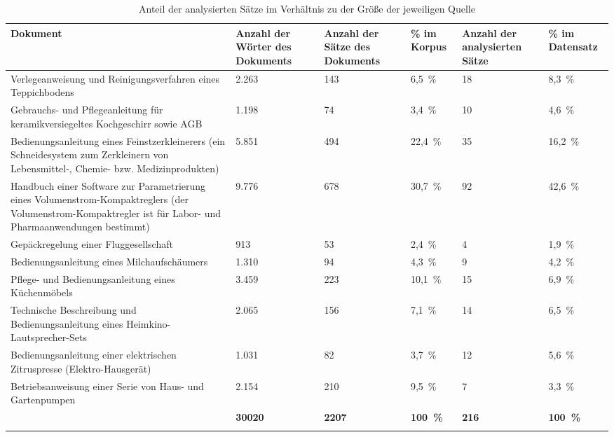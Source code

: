 \begin{sidewaystable}
\small
\begin{tabularx}{\textwidth}{p{7cm}YYYYY}
\lsptoprule
\textbf{Dokument}\footnotemark{} & \textbf{Anzahl der Wörter des Dokuments} & \textbf{Anzahl der Sätze des Dokuments}  & \textbf{\% im Korpus} & \textbf{Anzahl der analysierten Sätze} & \textbf{\% im Datensatz}\\
\midrule
Verlegeanweisung und Reinigungsverfahren eines Teppichbodens & 2.263 & 143 & 6,5~\% & 18 & 8,3~\%\\
Gebrauchs- und Pflegeanleitung für keramikversiegeltes Kochgeschirr sowie AGB & 1.198 & 74 & 3,4~\% & 10 & 4,6~\%\\
Bedienungsanleitung eines Feinstzerkleinerers (ein Schneidesystem zum Zerkleinern von Lebensmittel-, Chemie- bzw. Medizinprodukten) & 5.851 & 494 & 22,4~\% & 35 & 16,2~\%\\
Handbuch einer Software zur Parametrierung eines Volumenstrom-Kompaktreglers (der Volumenstrom-Kompaktregler ist für Labor- und Pharmaanwendungen bestimmt) & 9.776 & 678 & 30,7~\% & 92 & 42,6~\%\\
Gepäckregelung einer Fluggesellschaft & 913 & 53 & 2,4~\% & 4 & 1,9~\%\\
Bedienungsanleitung eines Milchaufschäumers & 1.310 & 94 & 4,3~\% & 9 & 4,2~\%\\
Pflege- und Bedienungsanleitung eines Küchenmöbels & 3.459 & 223 & 10,1~\% & 15 & 6,9~\%\\
Technische Beschreibung und Bedienungsanleitung eines Heimkino-Lautsprecher-Sets & 2.065 & 156 & 7,1~\% & 14 & 6,5~\%\\
Bedienungsanleitung einer elektrischen Zitruspresse (Elektro-Hausgerät) & 1.031 & 82 & 3,7~\% & 12 & 5,6~\%\\
Betriebsanweisung einer Serie von Haus- und Gartenpumpen & 2.154 & 210 & 9,5~\% & 7 & 3,3~\%\\
\midrule
& \textbf{30020} & \textbf{2207} & \textbf{100~\%} & \textbf{216} & \textbf{100~\%}\\
\lspbottomrule
\end{tabularx}
\caption{\label{tab:4:4}Anteil der analysierten Sätze im Verhältnis zu der Größe der jeweiligen Quelle}
\end{sidewaystable}


